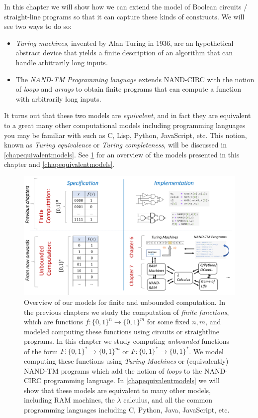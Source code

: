 In this chapter we will show how we can extend the model of Boolean
circuits / straight-line programs so that it can capture these kinds of
constructs. We will see two ways to do so:

\begin{itemize}
\item
  \emph{Turing machines}, invented by Alan Turing in 1936, are an
  hypothetical abstract device that yields a finite description of an
  algorithm that can handle arbitrarily long inputs.
\item
  The \emph{NAND-TM Programming language} extends NAND-CIRC with the
  notion of \emph{loops} and \emph{arrays} to obtain finite programs
  that can compute a function with arbitrarily long inputs.
\end{itemize}

It turns out that these two models are \emph{equivalent}, and in fact
they are equivalent to a great many other computational models including
programming languages you may be familiar with such as C, Lisp, Python,
JavaScript, etc. This notion, known as \emph{Turing equivalence} or
\emph{Turing completeness}, will be discussed in
\cref{chapequivalentmodels}. See \cref{chaploopoverviewfig} for an
overview of the models presented in this chapter and
\cref{chapequivalentmodels}.


\begin{figure}
\centering
\includegraphics[width=\textwidth, height=0.25\paperheight, keepaspectratio]{../figure/chaploopoverview.png}
\caption{Overview of our models for finite and unbounded computation. In
the previous chapters we study the computation of \emph{finite
functions}, which are functions \(f:\{0,1\}^n \rightarrow \{0,1\}^m\)
for some fixed \(n,m\), and modeled computing these functions using
circuits or straightline programs. In this chapter we study computing
\emph{unbounded} functions of the form
\(F:\{0,1\}^* \rightarrow \{0,1\}^m\) or
\(F:\{0,1\}^* \rightarrow \{0,1\}^*\). We model computing these
functions using \emph{Turing Machines} or (equivalently) NAND-TM
programs which add the notion of \emph{loops} to the NAND-CIRC
programming language. In \cref{chapequivalentmodels} we will show that
these models are equivalent to many other models, including RAM
machines, the \(\lambda\) calculus, and all the common programming
languages including C, Python, Java, JavaScript, etc.}
\label{chaploopoverviewfig}
\end{figure}

